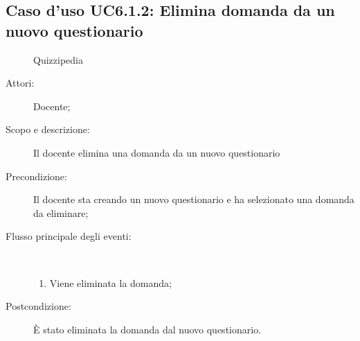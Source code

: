 \subsection{Caso d'uso UC6.1.2: Elimina domanda da un nuovo questionario}
	\begin{figure}[H]
		\centering
		\begin{resizedtikzpicture}{\textwidth}
		\begin{umlsystem}[x=0, fill=lightgray!20]{Quizzipedia}
		\end{umlsystem}
		\end{resizedtikzpicture}
		\caption{}
	\end{figure}
\begin{description}
\item[Attori:] Docente;
\item[Scopo e descrizione:] Il docente elimina una domanda da un nuovo questionario
      \item[Precondizione:] Il docente sta creando un nuovo questionario e ha selezionato una domanda da eliminare;

        \item[Flusso principale degli eventi:] \ 
 \begin{enumerate}
          \item Viene eliminata la domanda;

      \end{enumerate}
    \item[Postcondizione:] È stato eliminata la domanda dal nuovo questionario.
  \end{description}
\hypertarget{UC6.1.3}{}

